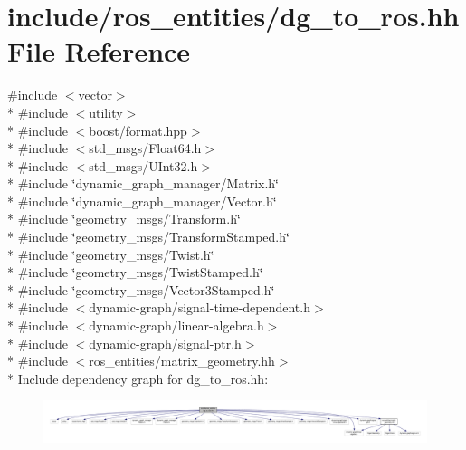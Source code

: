 \hypertarget{dg__to__ros_8hh}{}\section{include/ros\+\_\+entities/dg\+\_\+to\+\_\+ros.hh File Reference}
\label{dg__to__ros_8hh}
{\ttfamily \#include $<$vector$>$}\\*
{\ttfamily \#include $<$utility$>$}\\*
{\ttfamily \#include $<$boost/format.\+hpp$>$}\\*
{\ttfamily \#include $<$std\+\_\+msgs/\+Float64.\+h$>$}\\*
{\ttfamily \#include $<$std\+\_\+msgs/\+U\+Int32.\+h$>$}\\*
{\ttfamily \#include \char`\"{}dynamic\+\_\+graph\+\_\+manager/\+Matrix.\+h\char`\"{}}\\*
{\ttfamily \#include \char`\"{}dynamic\+\_\+graph\+\_\+manager/\+Vector.\+h\char`\"{}}\\*
{\ttfamily \#include \char`\"{}geometry\+\_\+msgs/\+Transform.\+h\char`\"{}}\\*
{\ttfamily \#include \char`\"{}geometry\+\_\+msgs/\+Transform\+Stamped.\+h\char`\"{}}\\*
{\ttfamily \#include \char`\"{}geometry\+\_\+msgs/\+Twist.\+h\char`\"{}}\\*
{\ttfamily \#include \char`\"{}geometry\+\_\+msgs/\+Twist\+Stamped.\+h\char`\"{}}\\*
{\ttfamily \#include \char`\"{}geometry\+\_\+msgs/\+Vector3\+Stamped.\+h\char`\"{}}\\*
{\ttfamily \#include $<$dynamic-\/graph/signal-\/time-\/dependent.\+h$>$}\\*
{\ttfamily \#include $<$dynamic-\/graph/linear-\/algebra.\+h$>$}\\*
{\ttfamily \#include $<$dynamic-\/graph/signal-\/ptr.\+h$>$}\\*
{\ttfamily \#include $<$ros\+\_\+entities/matrix\+\_\+geometry.\+hh$>$}\\*
Include dependency graph for dg\+\_\+to\+\_\+ros.\+hh\+:
\nopagebreak
\begin{figure}[H]
\begin{center}
\leavevmode
\includegraphics[width=350pt]{dg__to__ros_8hh__incl}
\end{center}
\end{figure}
